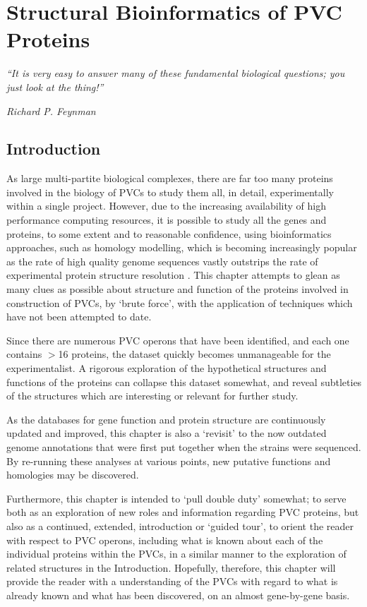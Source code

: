 \chapter{Structural Bioinformatics of PVC Proteins}\label{structbioinfo}

\epigraph{\emph{``It is very easy to answer many of these fundamental biological questions; you just look at the thing!''}}{\textit{Richard P. Feynman}}

\section{Introduction}

As large multi-partite biological complexes, there are far too many proteins involved in the biology of PVCs to study them all, in detail, experimentally within a single project. However, due to the increasing availability of high performance computing resources, it is possible to study all the genes and proteins, to some extent and to reasonable confidence, using bioinformatics approaches, such as homology modelling, which is becoming increasingly popular as the rate of high quality genome sequences vastly outstrips the rate of experimental protein structure resolution \citep{Rodriguez1998}. This chapter attempts to glean as many clues as possible about structure and function of the proteins involved in construction of PVCs, by `brute force', with the application of techniques which have not been attempted to date.

Since there are numerous PVC operons that have been identified, and each one contains $>$16 proteins, the dataset quickly becomes unmanageable for the experimentalist. A rigorous exploration of the hypothetical structures and functions of the proteins can collapse this dataset somewhat, and reveal subtleties of the structures which are interesting or relevant for further study. 

As the databases for gene function and protein structure are continuously updated and improved, this chapter is also a `revisit' to the now outdated genome annotations that were first put together when the strains were sequenced. By re-running these analyses at various points, new putative functions and homologies may be discovered.

Furthermore, this chapter is intended to `pull double duty' somewhat; to serve both as an exploration of new roles and information regarding PVC proteins, but also as a continued, extended, introduction or `guided tour', to orient the reader with respect to PVC operons, including what is known about each of the individual proteins within the PVCs, in a similar manner to the exploration of related structures in the Introduction. Hopefully, therefore, this chapter will provide the reader with a understanding of the PVCs with regard to what is already known and what has been discovered, on an almost gene-by-gene basis.

